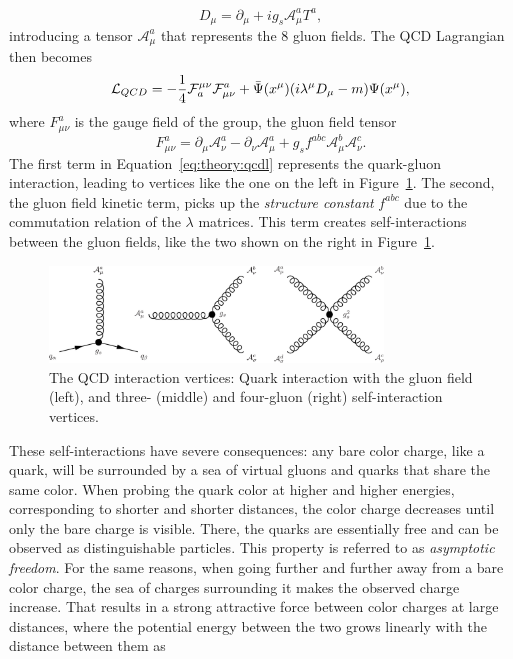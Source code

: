 \begin{equation}
  D_\mu=\partial_\mu + ig_s \mathcal{A}_{\mu}^a T^a ,
\end{equation}
introducing a tensor $\mathcal{A}_{\mu}^a$ that represents the 8 gluon fields.
The QCD Lagrangian then becomes
\begin{equation}
  \label{eq:theory:qcdl}
   \mathcal{L}_{QCD} =-\frac{1}{4}{\cal F}_{a}^{\mu\nu}{\cal F}^{a}_{\mu\nu}+\bar{\Psi}(x^{\mu})(i\lambda^{\mu}D_{\mu}-m)\Psi(x^{\mu}),
\end{equation}
where $F_{\mu\nu}^a$ is the gauge field of the group, the gluon field tensor 
\begin{equation}
F_{\mu\nu}^a=\partial_{\mu} \mathcal{A}_{\nu}^a-\partial_{\nu} \mathcal{A}_{\mu}^a+g_s f^{abc}\mathcal{A}_{\mu}^b\mathcal{A}_{\nu}^c.
\end{equation}
The first term in Equation~\ref{eq:theory:qcdl} represents the quark-gluon interaction, leading to vertices like the one on the left in Figure~\ref{fig:theory:qcdint}. The second, the gluon field kinetic term, picks up the \emph{structure constant} $f^{abc}$ due to the commutation relation of the $\lambda$ matrices. This term creates self-interactions between the gluon fields, like the two shown on the right in Figure~\ref{fig:theory:qcdint}.
\begin{figure}[h!]
\centering
\includegraphics[width=0.79\textwidth]{figures/theory/QCD_vtx.pdf}
\caption{The QCD interaction vertices: Quark interaction with the gluon field (left), and three- (middle) and four-gluon (right) self-interaction vertices.}
\label{fig:theory:qcdint}
\end{figure}
These self-interactions have severe consequences: any bare color charge, like a quark, will be surrounded by a sea of virtual gluons and quarks that share the same color. When probing the quark color at higher and higher energies, corresponding to shorter and shorter distances, the color charge decreases until only the bare charge is visible. There, the quarks are essentially free and can be observed as distinguishable particles. This property is referred to as \emph{asymptotic freedom}. For the same reasons, when going further and further away from a bare color charge, the sea of charges surrounding it makes the observed charge increase. That results in a strong attractive force between color charges at large distances, where the potential energy between the two grows linearly with the distance between them as
